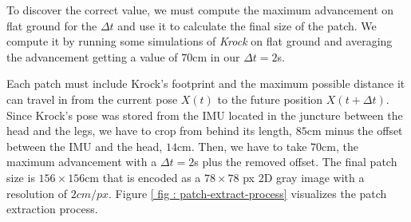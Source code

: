 \documentclass[../document.tex]{subfiles}
\begin{document}
To discover the correct value, we must compute the maximum advancement on flat ground for the $\Delta t$ and use it to calculate the final size of the patch. We compute it by running some simulations of \emph{Krock} on flat ground and averaging the advancement getting a value of $70$cm in our $\Delta t = 2$s.

Each patch must include Krock's footprint and the maximum possible distance it can travel in from the current pose $X(t)$ to the future position $X(t + \Delta t)$. Since Krock's pose was stored from the IMU located in the juncture between the head and the legs, we have to crop from behind its length, $85$cm minus the offset between the IMU and the head, $14$cm. Then, we have to take $70$cm, the maximum advancement with a $\Delta t = 2$s plus the removed offset. The final patch size is $156\times156$cm that is encoded as a $78\times78$ px 2D gray image with a resolution of $2cm/px$. Figure \ref{ fig : patch-extract-process} visualizes the patch extraction process. 
\end{document}

